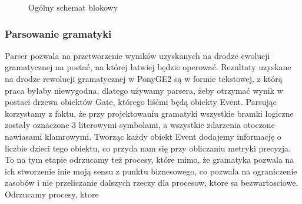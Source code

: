 \begin{figure}[!ht]
	\caption{\label{fig:flow_chart}Ogólny schemat blokowy}
\end{figure}

\subsubsection{Parsowanie gramatyki}
Parser pozwala na przetworzenie wyników uzyskanych na drodze ewolucji gramatycznej na postać, na której łatwiej będzie operować. Rezultaty uzyskane na drodze rewolucji gramatycznej w PonyGE2 są w formie tekstowej, z którą praca byłaby niewygodna, dlatego używamy parsera, żeby otrzymać wynik w postaci drzewa obiektów Gate, którego liśćmi będą obiekty Event.
Parsując korzystamy z faktu, że przy projektowaniu gramatyki wszystkie bramki logiczne zostały oznaczone 3 literowymi symbolami, a wszystkie zdarzenia otoczone nawiasami klamrowymi. Tworząc każdy obiekt Event dodajemy informację o liczbie dzieci tego obiektu, co przyda nam się przy obliczaniu metryki precyzja.
To na tym etapie odrzucamy też procesy, które mimo, że gramatyka pozwala na ich stworzenie inie moją sensu z punktu biznesowego, co pozwala na ograniczenie zasobów i nie przeliczanie dalszych rzeczy dla procesow, ktore sa bezwartosciowe. Odrzucamy procesy, ktore  

